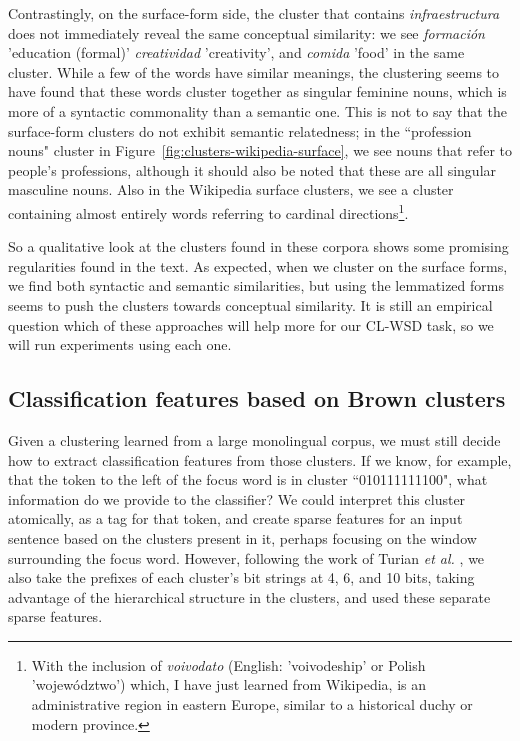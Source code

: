 Contrastingly, on the surface-form side, the cluster that contains
\emph{infraestructura} does not immediately reveal the same conceptual
similarity: we see \emph{formación} 'education (formal)' \emph{creatividad}
'creativity', and \emph{comida} 'food' in the same cluster. While a few of the
words have similar meanings, the clustering seems to have found that these
words cluster together as singular feminine nouns, which is more of a
syntactic commonality than a semantic one. This is not to say that the
surface-form clusters do not exhibit semantic relatedness; in the ``profession
nouns" cluster in Figure~\ref{fig:clusters-wikipedia-surface}, we see nouns
that refer to people's professions, although it should also be noted that these
are all singular masculine nouns. Also in the Wikipedia surface clusters, we
see a cluster containing almost entirely words referring to cardinal
directions\footnote{With the inclusion of \emph{voivodato} (English:
'voivodeship' or Polish 'województwo') which, I have just learned from
Wikipedia, is an administrative region in eastern Europe, similar to a
historical duchy or modern province.}.

So a qualitative look at the clusters found in these corpora shows some
promising regularities found in the text. As expected, when we cluster on the
surface forms, we find both syntactic and semantic similarities, but using the
lemmatized forms seems to push the clusters towards conceptual similarity. It
is still an empirical question which of these approaches will help more for our
CL-WSD task, so we will run experiments using each one.

\subsection{Classification features based on Brown clusters}
Given a clustering learned from a large monolingual corpus, we must still
decide how to extract classification features from those clusters. If we know,
for example, that the token to the left of the focus word is in cluster
``010111111100", what information do we provide to the classifier? We could
interpret this cluster atomically, as a tag for that token, and create sparse
features for an input sentence based on the clusters present in it, perhaps
focusing on the window surrounding the focus word. However, following the work
of Turian \emph{et al.} \cite{turian-ratinov-bengio:2010:ACL}, we also take the
prefixes of each cluster's bit strings at 4, 6, and 10 bits, taking advantage
of the hierarchical structure in the clusters, and used these separate sparse
features.

